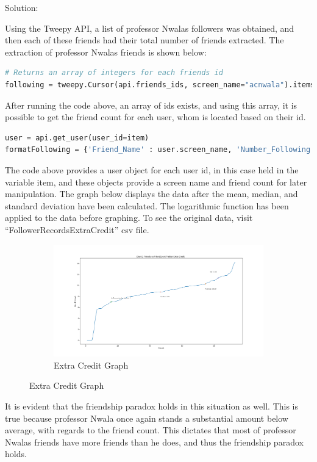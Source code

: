 \documentclass[11pt]{scrartcl} %
\begin{document}
\bigskip\bigskip
\LARGE Solution: \newline\newline\small

\tabto{2.0 cm} Using the Tweepy API, a list of professor Nwalas followers was obtained, and then each of these friends had their total number of friends extracted. The extraction of professor Nwalas friends is shown below: 

\begin{lstlisting}[language = Python, caption=Extracting Friend Count]
# Returns an array of integers for each friends id
following = tweepy.Cursor(api.friends_ids, screen_name="acnwala").items()
\end{lstlisting}

After running the code above, an array of ids exists, and using this array, it is possible to get the friend count for each user, whom is located based on their id. 

\begin{lstlisting}[language = Python, caption=Extracting Friend Count]
user = api.get_user(user_id=item)
formatFollowing = {'Friend_Name' : user.screen_name, 'Number_Following' : user.friends_count}
\end{lstlisting}

\tabto{2.0cm} The code above provides a user object for each user id, in this case held in the variable item, and these objects provide a screen name and friend count for later manipulation. The graph below displays the data after the mean, median, and standard deviation have been calculated. The logarithmic function has been applied to the data before graphing. To see the original data, visit ``FollowerRecordsExtraCredit'' csv file. 


\begin{figure}[h!]
\begin{center}
\begin{subfigure}[b]{1.1\linewidth }
    \includegraphics[width=\linewidth]{../Figures/ExtraCredit.png}
    \caption{Extra Credit Graph}
\end{subfigure}
\end{center}
\end{figure}

\tabto{2.0cm} It is evident that the friendship paradox holds in this situation as well. This is true because professor Nwala once again stands a substantial amount below average, with regards to the friend count. This dictates that most of professor Nwalas friends have more friends than he does, and thus the friendship paradox holds.
\end{document}
